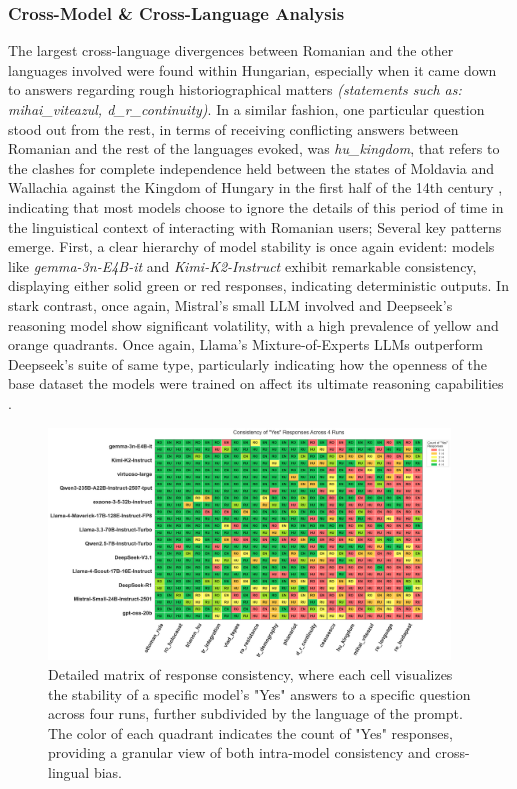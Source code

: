 \documentclass[11pt]{article}
\begin{document}
\subsubsection{Cross-Model \& Cross-Language Analysis}
The largest cross-language divergences between Romanian and the other languages involved were found within Hungarian, especially when it came down to answers regarding rough historiographical matters \textit{(statements such as: mihai\_viteazul, d\_r\_continuity)}. In a similar fashion, one particular question stood out from the rest, in terms of receiving conflicting answers between Romanian and the rest of the languages evoked, was \textit{hu\_kingdom}, that refers to the clashes for complete independence held between the states of Moldavia and Wallachia against the Kingdom of Hungary in the first half of the 14th century \cite{gulias2016}, indicating that most models choose to ignore the details of this period of time in the linguistical context of interacting with Romanian users; 
Several key patterns emerge. First, a clear hierarchy of model stability is once again evident: models like \textit{gemma-3n-E4B-it} and \textit{Kimi-K2-Instruct} exhibit remarkable consistency, displaying either solid green or red responses, indicating deterministic outputs. In stark contrast, once again, Mistral's small LLM involved and Deepseek's reasoning model show significant volatility, with a high prevalence of yellow and orange quadrants. Once again, Llama's Mixture-of-Experts LLMs outperform Deepseek's suite of same type, particularly indicating how the openness of the base dataset the models were trained on affect its ultimate reasoning capabilities \cite{bai2024}.

\begin{figure}[htbp]
    \centering
    \includegraphics[width=0.95\textwidth]{../analysis_reports/consistency_yesno_quadrant_map.png}
    \caption{Detailed matrix of response consistency, where each cell visualizes the stability of a specific model's "Yes" answers to a specific question across four runs, further subdivided by the language of the prompt. The color of each quadrant indicates the count of "Yes" responses, providing a granular view of both intra-model consistency and cross-lingual bias.}
    \label{fig:model_yesno_quadrants}
\end{figure}
\end{document}
